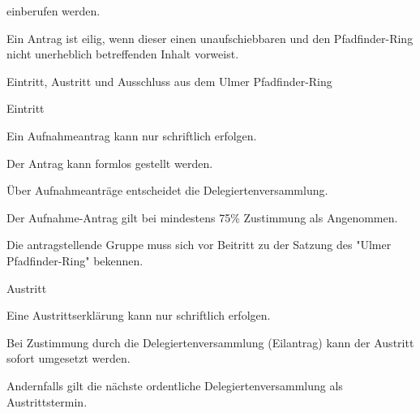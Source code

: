 \begin{legal}
\begin{legal}
\begin{legal}
                          einberufen werden.
                        \begin{legal}
                            \item Ein Antrag ist eilig, wenn dieser einen unaufschiebbaren und den 
                                  Pfadfinder-Ring nicht unerheblich betreffenden Inhalt vorweist.
                        \end{legal}
                \end{legal}
        \end{legal}
    \item Eintritt, Austritt und Ausschluss aus dem Ulmer Pfadfinder-Ring
        \begin{legal}
            \item Eintritt
                \begin{legal}
                    \item Ein Aufnahmeantrag kann nur schriftlich erfolgen.
                        \begin{legal}
                            \item Der Antrag kann formlos gestellt werden.
                        \end{legal}
                    \item Über Aufnahmeanträge entscheidet die Delegiertenversammlung.
                        \begin{legal}
                            \item Der Aufnahme-Antrag gilt bei mindestens 75\% Zustimmung als 
                                  Angenommen.
                        \end{legal}
                    \item Die antragstellende Gruppe muss sich vor Beitritt zu der Satzung des 
                          "Ulmer Pfadfinder-Ring" bekennen.
                \end{legal}
            \item Austritt
                \begin{legal}
                    \item Eine Austrittserklärung kann nur schriftlich erfolgen.
                    \item Bei Zustimmung durch die Delegiertenversammlung (Eilantrag) kann der 
                          Austritt sofort umgesetzt werden.
                    \item Andernfalls gilt die nächste ordentliche Delegiertenversammlung als 
                          Austrittstermin.

\end{legal}
\end{legal}
\end{legal}
